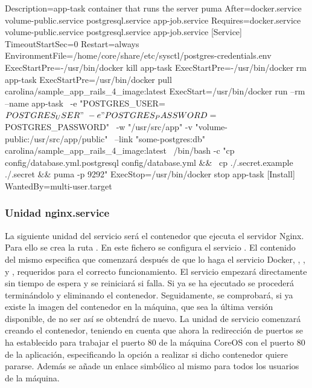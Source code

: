 \begin{codelisting}
\label{code:app-task.service}
\begin{code}
[Unit] 
  Description=app-task container that runs the server puma
  After=docker.service volume-public.service postgresql.service app-job.service
  Requires=docker.service volume-public.service postgresql.service app-job.service
[Service] 
  TimeoutStartSec=0
  Restart=always 
  EnvironmentFile=/home/core/share/etc/sysctl/postgres-credentials.env
  ExecStartPre=-/usr/bin/docker kill app-task 
  ExecStartPre=-/usr/bin/docker rm app-task
  ExecStartPre=/usr/bin/docker pull carolina/sample_app_rails_4_image:latest 
  ExecStart=/usr/bin/docker run --rm --name app-task \
  -e "POSTGRES_USER=${POSTGRES_USER}" \
  -e "POSTGRES_PASSWORD=${POSTGRES_PASSWORD}" \
  -w "/usr/src/app" -v "volume-public:/usr/src/app/public" \
  --link "some-postgres:db" carolina/sample_app_rails_4_image:latest \
  /bin/bash -c "cp config/database.yml.postgresql config/database.yml && \
  cp ./.secret.example ./.secret && puma -p 9292"
  ExecStop=/usr/bin/docker stop app-task
[Install] 
  WantedBy=multi-user.target
\end{code}
\end{codelisting}

\subsubsection{Unidad nginx.service}

La siguiente unidad del servicio será el contenedor que ejecuta el servidor Nginx. Para ello se crea la ruta . En este fichero se configura el servicio . El contenido del mismo especifica que comenzará después de que lo haga el servicio Docker, , ,  y , requeridos para el correcto funcionamiento. El servicio empezará directamente sin tiempo de espera y se reiniciará si falla. Si ya se ha ejecutado se procederá terminándolo y eliminando el contenedor. Seguidamente, se comprobará, si ya existe la imagen del contenedor en la máquina, que sea la última versión disponible, de no ser así se obtendrá de nuevo. La unidad de servicio comenzará creando el contenedor, teniendo en cuenta que ahora la redirección de puertos se ha establecido para trabajar el puerto 80 de la máquina CoreOS con el puerto 80 de la aplicación, especificando la opción a realizar si dicho contenedor quiere pararse. Además se añade un enlace simbólico al mismo para todos los usuarios de la máquina. 

